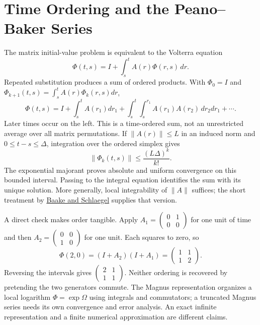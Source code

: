 \section{Time Ordering and the Peano--Baker Series}

The matrix initial-value problem is equivalent to the Volterra equation
\begin{equation}
\Phi(t,s)=I+\int_s^t A(r)\Phi(r,s)\,dr.
\end{equation}
Repeated substitution produces a sum of ordered products. With $\Phi_0=I$ and $\Phi_{k+1}(t,s)=\int_s^t A(r)\Phi_k(r,s)dr$,
\begin{equation}
\Phi(t,s)=I+\int_s^t A(r_1)dr_1+
\int_s^t\int_s^{r_1}A(r_1)A(r_2)\,dr_2dr_1+\cdots.
\label{eq:ch2:peano-baker}
\end{equation}
Later times occur on the left. This is a time-ordered sum, not an unrestricted average over all matrix permutations. If $\|A(r)\|\le L$ in an induced norm and $0\le t-s\le\Delta$, integration over the ordered simplex gives
\begin{equation}
\|\Phi_k(t,s)\|\le\frac{(L\Delta)^k}{k!}.
\end{equation}
The exponential majorant proves absolute and uniform convergence on this bounded interval. Passing to the integral equation identifies the sum with its unique solution. More generally, local integrability of $\|A\|$ suffices; the short treatment by \href{https://arxiv.org/abs/1011.1775}{Baake and Schlaegel} supplies that version.

A direct check makes order tangible. Apply $A_1=\begin{pmatrix}0&1\\0&0\end{pmatrix}$ for one unit of time and then $A_2=\begin{pmatrix}0&0\\1&0\end{pmatrix}$ for one unit. Each squares to zero, so
\begin{equation}
\Phi(2,0)=(I+A_2)(I+A_1)=\begin{pmatrix}1&1\\1&2\end{pmatrix}.
\end{equation}
Reversing the intervals gives $\begin{pmatrix}2&1\\1&1\end{pmatrix}$. Neither ordering is recovered by pretending the two generators commute. The Magnus representation organizes a local logarithm $\Phi=\exp\Omega$ using integrals and commutators; a truncated Magnus series needs its own convergence and error analysis. An exact infinite representation and a finite numerical approximation are different claims.

